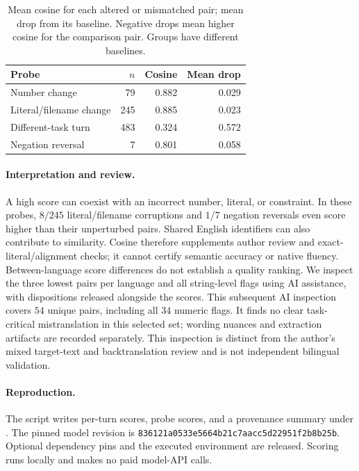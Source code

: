 \begin{table}[ht]
\centering\footnotesize\setlength{\tabcolsep}{3pt}
\begin{tabular*}{\columnwidth}{@{\extracolsep{\fill}}lrrr@{}}\toprule
Probe & $n$ & Cosine & Mean drop \\\midrule
Number change & 79 & 0.882 & 0.029 \\
Literal/filename change & 245 & 0.885 & 0.023 \\
Different-task turn & 483 & 0.324 & 0.572 \\
Negation reversal & 7 & 0.801 & 0.058 \\
\bottomrule\end{tabular*}
\caption{Mean cosine for each altered or mismatched pair; mean drop from its
baseline. Negative drops mean higher cosine for the comparison pair. Groups
have different baselines.}
\label{tab:labse_controls}\end{table}

\paragraph{Interpretation and review.} A high score can coexist with an
incorrect number, literal, or constraint. In these probes, $8/245$
literal/filename corruptions and $1/7$ negation reversals even score
higher than their unperturbed pairs. Shared English identifiers
can also contribute to similarity. Cosine therefore supplements author
review and exact-literal/alignment checks; it cannot certify semantic
accuracy or native fluency.
Between-language score differences do not establish a quality ranking.
We inspect the three lowest pairs per language and all string-level flags using AI assistance,
with dispositions released alongside the scores. This subsequent AI
inspection covers $54$ unique pairs, including all $34$ numeric flags.
It finds no clear task-critical mistranslation in this selected set;
wording nuances and extraction artifacts are recorded separately. This
inspection is distinct from the author's mixed target-text and
backtranslation review and is not independent bilingual validation.

\paragraph{Reproduction.} The script
 writes per-turn scores,
probe scores, and a provenance summary under
. The pinned model revision
is {\footnotesize\texttt{836121a0533e5664b21c7aacc5d22951f2b8b25b}}.
Optional dependency pins and the executed environment are released.
Scoring runs locally and makes no paid model-API calls.
